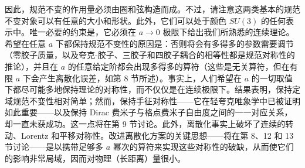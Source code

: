 因此，规范不变的作用量必须由圈和弦构造而成。不过，请注意这两类基本的规范不变对象可以有任意的大小和形状。此外，它们可以处于颜色 \(SU(3)\) 的任何表示中。唯一必要的约束是，它必须在 \(a \to 0\) 极限下给出我们所熟悉的连续理论。希望在任意 \(a\) 下都保持规范不变性的原因是：否则将会有多得多的参数需要调节（零胶子质量，以及夸克-胶子、三胶子和四胶子耦合的相等性都是规范对称性的推论），并且在 \(a\) 的任意给定阶都会出现多得多的算符（这些是无关算符，但在有限 \(a\) 下会产生离散化误差，如第 8 节所述）。事实上，人们希望在 \(a\) 的一切取值下都尽可能多地保持理论的对称性，而不仅仅是在连续极限下。结果表明，保持定域规范不变性相对简单；然而，保持手征对称性——它在轻夸克唯象学中已被证明如此重要——以及保持 Dirac 费米子与格点费米子自由度之间的一一对应关系，却一直未获成功。这一点将在第 9 节讨论。此外，离散化事实上破坏了连续的转动、Lorentz 和平移对称性。改进离散化方案的关键思想——将在第 8、12 和 13 节讨论——是以携带足够多 $a$ 幂次的算符来实现这些对称性的破缺，从而使它们的影响非常局域，因而对物理（长距离）量很小。
